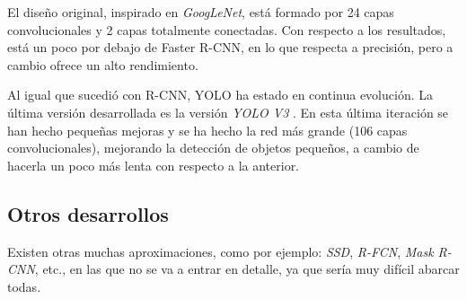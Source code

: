 El diseño original, inspirado en \textit{GoogLeNet}, está formado por 24 capas convolucionales y 2 capas totalmente conectadas. Con respecto a los resultados, está un poco por debajo de Faster R-CNN, en lo que respecta a precisión, pero a cambio ofrece un alto rendimiento.

Al igual que sucedió con R-CNN, YOLO ha estado en continua evolución. La última versión desarrollada es la versión \textit{YOLO V3} \cite{s2_stateofart_yolov3}. En esta última iteración se han hecho pequeñas mejoras y se ha hecho la red más grande (106 capas convolucionales), mejorando la detección de objetos pequeños, a cambio de hacerla un poco más lenta con respecto a la anterior.

\subsection*{Otros desarrollos}

Existen otras muchas aproximaciones, como por ejemplo: \textit{SSD}, \textit{R-FCN}, \textit{Mask R-CNN}, etc., en las que no se va a entrar en detalle, ya que sería muy difícil abarcar todas.